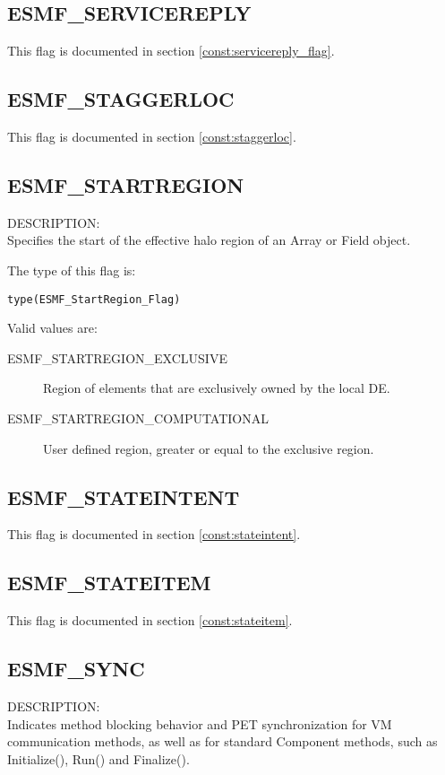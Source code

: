 \subsection{ESMF\_SERVICEREPLY}
This flag is documented in section \ref{const:servicereply_flag}.

\subsection{ESMF\_STAGGERLOC}
This flag is documented in section \ref{const:staggerloc}.

\subsection{ESMF\_STARTREGION}
\label{const:startregion}
{\sf DESCRIPTION:\\}
Specifies the start of the effective halo region of an Array or Field object.

The type of this flag is:

{\tt type(ESMF\_StartRegion\_Flag)}

Valid values are:
\begin{description}
\item [ESMF\_STARTREGION\_EXCLUSIVE]
      Region of elements that are exclusively owned by the local DE.
\item [ESMF\_STARTREGION\_COMPUTATIONAL]
      User defined region, greater or equal to the exclusive region.
\end{description}

\subsection{ESMF\_STATEINTENT}
This flag is documented in section \ref{const:stateintent}.

\subsection{ESMF\_STATEITEM}
This flag is documented in section \ref{const:stateitem}.

\subsection{ESMF\_SYNC}
\label{const:sync}
{\sf DESCRIPTION:\\}  
Indicates method blocking behavior and PET synchronization for VM communication
methods, as well as for standard Component methods, such as Initialize(), Run() 
and Finalize().

